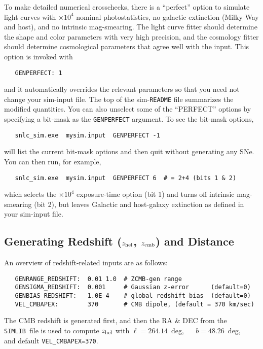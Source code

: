 \documentclass[12pt]{article}
\newcommand{\simlib}{{\tt SIMLIB}}
\newcommand{\zhelio}{z_{\rm hel}}
\newcommand{\zcmb}{z_{\rm cmb}}
\begin{document}
To make detailed numerical crosschecks,
there is a ``perfect'' option to simulate light curves
with $\times 10^4$ nominal photostatistics, no galactic
extinction (Milky Way and host), and no intrinsic mag-smearing.
The light curve fitter should determine the shape and color
parameters with very high precision, and the cosmology fitter
should determine cosmological parameters that agree well
with the input. This option is invoked with
%
\begin{verbatim}
   GENPERFECT: 1
\end{verbatim}
%
and it automatically overrides the relevant parameters
so that you need not change your sim-input file.
The top of the sim-{\tt README} file summarizes
the modified quantities.
You can also unselect some of the ``PERFECT'' options
by specifying a bit-mask as the {\tt GENPERFECT} argument.
To see the bit-mask options,
%
\begin{verbatim}
   snlc_sim.exe  mysim.input  GENPERFECT -1
\end{verbatim}
%
will list the current bit-mask options
and then quit without generating any SNe. 
You can then run, for example,
\begin{verbatim}
   snlc_sim.exe  mysim.input  GENPERFECT 6  # = 2+4 (bits 1 & 2)
\end{verbatim}
%
which selects the $\times 10^4$ exposure-time option 
(bit 1) and turns off intrinsic mag-smearing (bit 2), 
but leaves Galactic and host-galaxy extinction as defined 
in your sim-input file.


\clearpage
\subsection{Generating Redshift ($\zhelio$, $\zcmb$) and Distance }
\label{subsec:genz}

An overview of redshift-related inputs are as follows:
\begin{verbatim}
   GENRANGE_REDSHIFT:  0.01 1.0  # ZCMB-gen range
   GENSIGMA_REDSHIFT:  0.001     # Gaussian z-error      (default=0)
   GENBIAS_REDSHIFT:   1.0E-4    # global redshift bias  (default=0)
   VEL_CMBAPEX:        370       # CMB dipole, (default = 370 km/sec)
\end{verbatim}
%
The CMB redshift is generated first, and then the RA \& DEC
from the \simlib\ file is used to compute $\zhelio$ with
$\ell=264.14$~deg, ~~ $b=48.26$~deg,~~
and default {\tt VEL\_CMBAPEX=370}.
\end{document}
